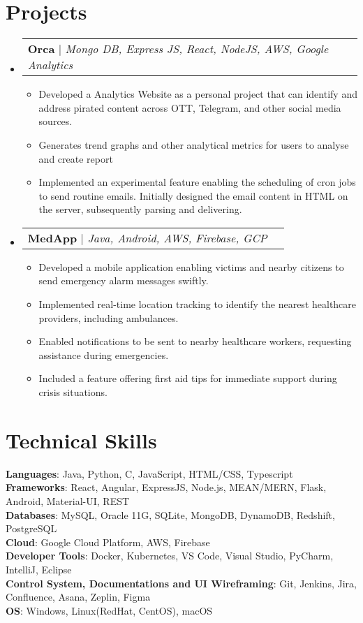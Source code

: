 \documentclass[letterpaper,11pt]{article}
\makeatletter
\newcommand{\resumeItem}[1]{
  \item\small{
    {#1 \vspace{-2pt}}
  }
}
\newcommand{\resumeProjectHeading}[2]{
    \item
    \begin{tabular*}{0.97\textwidth}{l@{\extracolsep{\fill}}r}
      \small#1 & #2 \\
    \end{tabular*}\vspace{-7pt}
}
\newcommand{\resumeSubHeadingListStart}{\begin{itemize}[leftmargin=0.15in, label={}]}
\newcommand{\resumeSubHeadingListEnd}{\end{itemize}}
\newcommand{\resumeItemListStart}{\begin{itemize}}
\newcommand{\resumeItemListEnd}{\end{itemize}\vspace{-5pt}}
\makeatother
\begin{document}
\section{Projects}
    \resumeSubHeadingListStart
      \resumeProjectHeading
          {\textbf{Orca} $|$ \emph{Mongo DB, Express JS, React, NodeJS, AWS, Google Analytics}}{}
          \resumeItemListStart
            \resumeItem{Developed a Analytics Website as a personal project that can identify and address pirated content across OTT, Telegram, and other social media sources.}
            \resumeItem{Generates trend graphs and other analytical metrics for users to analyse and create report}
            \resumeItem{Implemented an experimental feature enabling the scheduling of cron jobs to send routine emails. Initially designed the email content in HTML on the server, subsequently parsing and delivering.}
          \resumeItemListEnd
      \resumeProjectHeading
          {\textbf{MedApp} $|$ \emph{Java, Android, AWS, Firebase, GCP}}{}
          \resumeItemListStart
            \resumeItem{Developed a mobile application enabling victims and nearby citizens to send emergency alarm messages swiftly.}
            \resumeItem{Implemented real-time location tracking to identify the nearest healthcare providers, including ambulances.}
            \resumeItem{Enabled notifications to be sent to nearby healthcare workers, requesting assistance during emergencies.}
            \resumeItem{Included a feature offering first aid tips for immediate support during crisis situations.}
          \resumeItemListEnd
    \resumeSubHeadingListEnd



%
\section{Technical Skills}
 \begin{itemize}[leftmargin=0.15in, label={}]
    \small{\item{
     \textbf{Languages}{: Java, Python, C, JavaScript, HTML/CSS, Typescript} \\
     \textbf{Frameworks}{: React, Angular, ExpressJS, Node.js, MEAN/MERN, Flask, Android, Material-UI, REST} \\
     \textbf{Databases}{: MySQL, Oracle 11G, SQLite, MongoDB, DynamoDB, Redshift, PostgreSQL} \\
     \textbf{Cloud}{: Google Cloud Platform, AWS, Firebase} \\
     \textbf{Developer Tools}{: Docker, Kubernetes, VS Code, Visual Studio, PyCharm, IntelliJ, Eclipse} \\
     \textbf{Control System, Documentations and UI Wireframing}{: Git, Jenkins, Jira, Confluence, Asana, Zeplin, Figma} \\
     \textbf{OS}{: Windows, Linux(RedHat, CentOS), macOS}
    }}
 \end{itemize}
\end{document}
